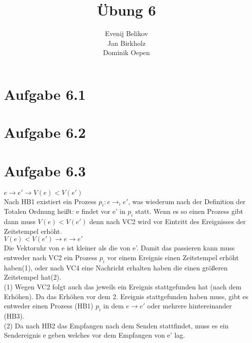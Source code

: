\documentclass{scrartcl}
\begin{document}
\title{Übung 6}
\author{Evenij Belikov\\Jan Birkholz\\Dominik Oepen}
\maketitle

\section*{Aufgabe 6.1}

\section*{Aufgabe 6.2}



\section*{Aufgabe 6.3}
$ e \rightarrow e' \longrightarrow  V(e) < V(e') $\\
Nach HB1 existiert ein Prozess $ p_{i}: e \rightarrow_{i} e' $, was wiederum nach der Definition der Totalen Ordnung heißt: e findet vor e' in $ p_{i} $ statt.
Wenn es so einen Prozess gibt dann muss $V(e) < V(e')$ denn nach VC2 wird vor Eintritt des Ereignisses der Zeitstempel erhöht.\\
$V(e) < V(e') \longrightarrow e \rightarrow e' $ \\
Die Vektoruhr von e ist kleiner als die von e'. Damit das passieren kann muss entweder nach VC2 ein Prozess $p_{i}$ vor einem Ereignis einen Zeitstempel erhöht haben(1), oder nach VC4 eine Nachricht erhalten haben die einen größeren Zeitstempel hat(2).\\
(1) Wegen VC2 folgt auch das jeweils ein Ereignis stattgefunden hat (nach dem Erhöhen). Da das Erhöhen vor dem 2. Ereignis stattgefunden haben muss, gibt es entweder einen Prozess (HB1) $p_{i}$ in dem $e \rightarrow e'$ oder mehrere hintereinander (HB3).\\
(2) Da nach HB2 das Empfangen nach dem Senden stattfindet, muss es ein Sendereignis e geben welches vor dem Empfangen von e' lag.\\


%
\end{document}
